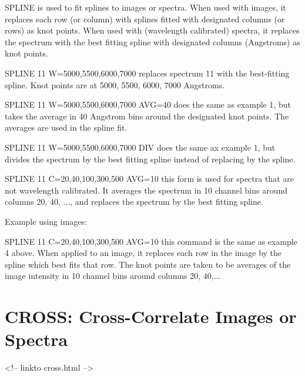 SPLINE is used to fit splines to images or spectra.  When used with images,
it replaces each row (or column) with splines fitted with designated
columns (or rows) as knot points.  When used with (wavelength calibrated)
spectra, it replaces the spectrum with the best fitting spline with
designated columns (Angstroms) as knot points.

\begin{example}
  \item[SPLINE 11 W=5000,5500,6000,7000\hfill]{ replaces spectrum 11 with
       the best-fitting spline.  Knot points are at 5000, 5500, 6000, 7000
       Angstroms.}

  \item[SPLINE 11 W=5000,5500,6000,7000 AVG=40\hfill]{ does the same as
       example 1, but takes the average in 40 Angstrom bins around the
       designated knot points.  The averages are used in the spline fit.}

  \item[SPLINE 11 W=5000,5500,6000,7000 DIV\hfill]{ does the same ax
       example 1, but divides the spectrum by the best fitting spline
       instead of replacing by the spline.}

  \item[SPLINE 11 C=20,40,100,300,500 AVG=10\hfill]{ this form is used for
       spectra that are not wavelength calibrated.  It averages the
       spectrum in 10 channel bins around columns 20, 40, ..., and replaces
       the spectrum by the best fitting spline.}
\end{example}


Example using images:

\begin{example}
  \item[SPLINE 11 C=20,40,100,300,500 AVG=10\hfill]{ this command is the
       same as example 4 above.  When applied to an image, it replaces each
       row in the image by the spline which best fits that row. The knot
       points are taken to be averages of the image intensity in 10 channel
       bins around columns 20, 40,...}
\end{example}

\section{CROSS: Cross-Correlate Images or Spectra}
\begin{rawhtml}
<!-- linkto cross.html -->
\end{rawhtml}

